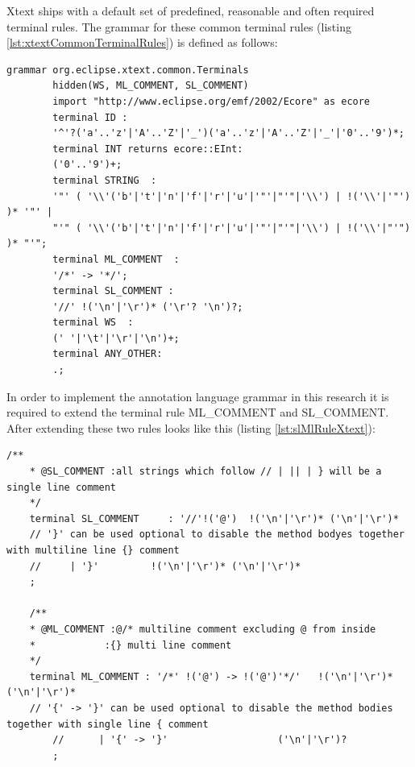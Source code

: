 Xtext ships with a default set of predefined, reasonable and often required terminal rules. The grammar for these common terminal rules (listing \ref{lst:xtextCommonTerminalRules}) is defined as follows:
	\begin{lstlisting}[caption={Common terminal Rules in Xtext },label=lst:xtextCommonTerminalRules]
		grammar org.eclipse.xtext.common.Terminals 
		hidden(WS, ML_COMMENT, SL_COMMENT)
		import "http://www.eclipse.org/emf/2002/Ecore" as ecore
		terminal ID : 
		'^'?('a'..'z'|'A'..'Z'|'_')('a'..'z'|'A'..'Z'|'_'|'0'..'9')*;
		terminal INT returns ecore::EInt: 
		('0'..'9')+;
		terminal STRING  : 
		'"' ( '\\'('b'|'t'|'n'|'f'|'r'|'u'|'"'|"'"|'\\') | !('\\'|'"') )* '"' |
		"'" ( '\\'('b'|'t'|'n'|'f'|'r'|'u'|'"'|"'"|'\\') | !('\\'|"'") )* "'"; 
		terminal ML_COMMENT  : 
		'/*' -> '*/';
		terminal SL_COMMENT : 
		'//' !('\n'|'\r')* ('\r'? '\n')?;
		terminal WS  : 
		(' '|'\t'|'\r'|'\n')+;
		terminal ANY_OTHER: 
		.;
	\end{lstlisting}

In order to implement the annotation language grammar in this research it is required to extend the terminal rule ML\_COMMENT and SL\_COMMENT. After extending these two rules looks like this (listing \ref{lst:slMlRuleXtext}):

\begin{lstlisting}[caption={Singleline and Multiline Comments Rule in Xtext},label=lst:slMlRuleXtext]
	/**
	* @SL_COMMENT :all strings which follow // | || | } will be a single line comment
	*/ 
	terminal SL_COMMENT 	: '//'!('@')  !('\n'|'\r')* ('\n'|'\r')*
	// '}' can be used optional to disable the method bodyes together with multiline line {} comment 
	//     | '}'         !('\n'|'\r')* ('\n'|'\r')*               
	;
	
	/**
	* @ML_COMMENT :@/* multiline comment excluding @ from inside
	*            :{} multi line comment 
	*/ 
	terminal ML_COMMENT	: '/*' !('@') -> !('@')'*/'   !('\n'|'\r')* ('\n'|'\r')*   
	// '{' -> '}' can be used optional to disable the method bodies together with single line { comment 
		//      | '{' -> '}'                   ('\n'|'\r')?
		;   
\end{lstlisting}

